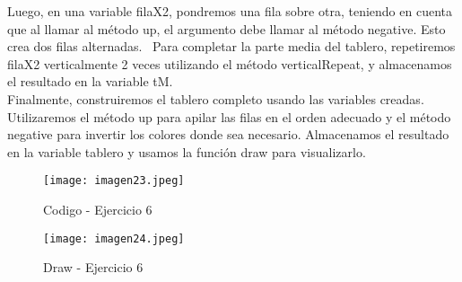 \documentclass[10pt, a4paper]{article}
\begin{document}
\begin{flushleft}
			Luego, en una variable filaX2, pondremos una fila sobre otra, teniendo en cuenta que al llamar al método up, el argumento debe llamar al método negative. Esto crea dos filas alternadas.	\		
			Para completar la parte media del tablero, repetiremos filaX2 verticalmente 2 veces utilizando el método verticalRepeat, y almacenamos el resultado en la variable tM.	\\		
			Finalmente, construiremos el tablero completo usando las variables creadas. Utilizaremos el método up para apilar las filas en el orden adecuado y el método negative para invertir los colores donde sea necesario. Almacenamos el resultado en la variable tablero y usamos la función draw para visualizarlo.\\
		\end{flushleft}
		\begin{figure}[h]
			\centering
			\texttt{[image: imagen23.jpeg]}
			\caption{Codigo - Ejercicio 6}
		\end{figure}
		\begin{figure}[h]
			\centering
			\texttt{[image: imagen24.jpeg]}
			\caption{Draw - Ejercicio 6}
		\end{figure} 
\end{document}
